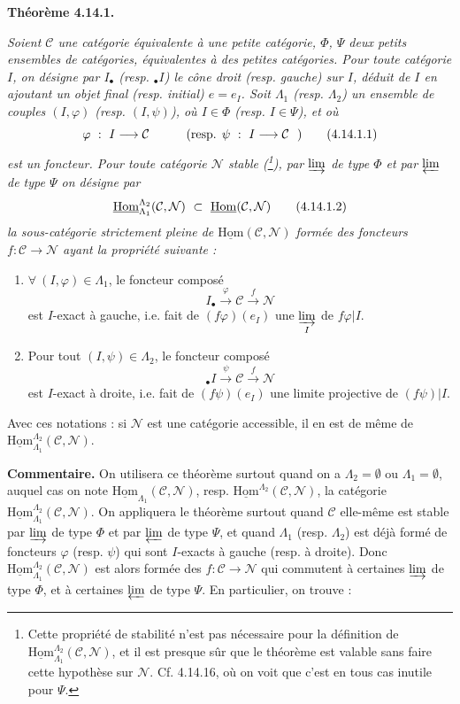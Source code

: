 \documentclass[11pt]{article}
\newcommand{\printedpage}[1]{\marginpar{\footnotesize p.~#1}}
\newcommand{\msp}[1]{\marginpar{\footnotesize [#1]}}
\newcommand{\uHom}{\underline{\mathrm{Hom}}}
\begin{document}
\noindent\textbf{Théorème 4.14.1.} {\itshape Soient $\mathcal{C}$ une catégorie équivalente à une petite catégorie, $\Phi$, $\Psi$ deux petits ensembles de catégories, équivalentes à des petites catégories. Pour toute catégorie $I$, on désigne par $I_{\bullet}$ (resp. ${}_{\bullet}I$) le cône droit (resp. gauche) sur $I$, déduit de $I$ en ajoutant un objet final (resp. initial) $e=e_I$. Soit $\Lambda_1$ (resp. $\Lambda_2$) un ensemble de couples $(I,\varphi)$ (resp. $(I,\psi)$), où $I\in\Phi$ (resp. $I\in\Psi$), et où
\[
\varphi\ :\ I \longrightarrow \mathcal{C} \qquad\quad \text{(resp. }\psi\ :\ I \longrightarrow \mathcal{C}\ \ \text{)} \tag*{\textup{(4.14.1.1)}}
\]
est un foncteur. Pour toute catégorie $\mathcal{N}$ stable (\footnote[163]{Cette propriété de stabilité n'est pas nécessaire pour la définition de $\uHom^{\Lambda_2}_{\Lambda_1}(\mathcal{C},\mathcal{N})$, et il est presque sûr que le théorème est valable sans faire cette hypothèse sur $\mathcal{N}$. Cf. 4.14.16, où on voit que c'est en tous cas inutile pour $\Psi$.}), par $\varinjlim$ de type $\Phi$ et par $\varprojlim$ de type $\Psi$ on désigne par
\[
\uHom^{\Lambda_2}_{\Lambda_1}(\mathcal{C},\mathcal{N})\ \subset\ \uHom(\mathcal{C},\mathcal{N}) \tag*{\textup{(4.14.1.2)}}
\]
la sous-catégorie strictement pleine de $\uHom(\mathcal{C},\mathcal{N})$ formée des foncteurs $f:\mathcal{C}\longrightarrow\mathcal{N}$ ayant la propriété suivante :
\begin{enumerate}[leftmargin=2.5em]
\item[\textit{a)}] $\forall\ (I,\varphi)\in\Lambda_1$, le foncteur composé
\[
I_{\bullet} \xrightarrow{\ \varphi\ } \mathcal{C} \xrightarrow{\ f\ } \mathcal{N}
\]
est $I$-exact à gauche, i.e. fait de $(f\varphi)(e_I)$ une $\varinjlim\limits_{I}$ de $f\varphi|I$.
\printedpage{141}
\msp{page 371}
\item[\textit{b)}] Pour tout $(I,\psi)\in\Lambda_2$, le foncteur composé
\[
{}_{\bullet}I \xrightarrow{\ \psi\ } \mathcal{C} \xrightarrow{\ f\ } \mathcal{N}
\]
est $I$-exact à droite, i.e. fait de $(f\psi)(e_I)$ une limite projective de $(f\psi)|I$.
\end{enumerate}
\noindent Avec ces notations : si $\mathcal{N}$ est une catégorie accessible, il en est de même de $\uHom^{\Lambda_2}_{\Lambda_1}(\mathcal{C},\mathcal{N})$.}

\noindent\textbf{Commentaire.} On utilisera ce théorème surtout quand on a $\Lambda_2=\emptyset$ ou $\Lambda_1=\emptyset$, auquel cas on note $\uHom_{\Lambda_1}(\mathcal{C},\mathcal{N})$, resp. $\uHom^{\Lambda_2}(\mathcal{C},\mathcal{N})$, la catégorie $\uHom^{\Lambda_2}_{\Lambda_1}(\mathcal{C},\mathcal{N})$. On appliquera le théorème surtout quand $\mathcal{C}$ elle-même est stable par $\varinjlim$ de type $\Phi$ et par $\varprojlim$ de type $\Psi$, et quand $\Lambda_1$ (resp. $\Lambda_2$) est déjà formé de foncteurs $\varphi$ (resp. $\psi$) qui sont $I$-exacts à gauche (resp. à droite). Donc $\uHom^{\Lambda_2}_{\Lambda_1}(\mathcal{C},\mathcal{N})$ est alors formée des $f:\mathcal{C}\longrightarrow\mathcal{N}$ qui commutent à certaines $\varinjlim$ de type $\Phi$, et à certaines $\varprojlim$ de type $\Psi$. En particulier, on trouve :
\end{document}
